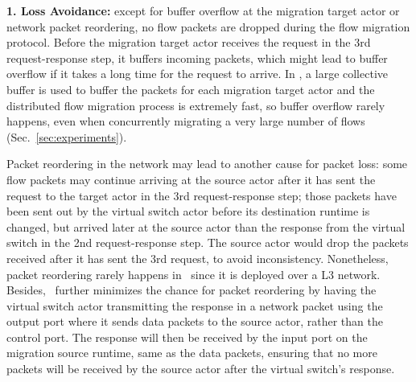\textbf{1. Loss Avoidance:} except for buffer overflow at the migration target actor or network packet reordering, no flow packets are dropped during the flow migration protocol. Before the migration target actor receives the request in the 3rd request-response step, it buffers incoming packets, which might lead to buffer overflow if it takes a long time for the request to arrive. %
 In \nfactor, a large collective buffer is used to buffer the packets for each migration target actor and the distributed flow migration process is extremely fast, so buffer overflow rarely happens, even when concurrently migrating a very large number of flows (Sec.~\ref{sec:experiments}). 
 
 Packet reordering in the network may lead to another cause for packet loss: some flow packets may continue arriving at the source actor after it has sent the request to the target actor in the 3rd request-response step; those packets have been sent out by the virtual switch actor before its destination runtime is changed, but arrived later at the source actor than the response from the virtual switch in the 2nd request-response step. %
 The source actor would drop the packets received after it has sent the 3rd request, to avoid inconsistency. Nonetheless, packet reordering rarely happens in \nfactor~since it is deployed over a L3 network. Besides, \nfactor~further minimizes the chance for packet reordering by having the virtual switch actor transmitting the response in a network packet using the output port where it sends data packets to the source actor, rather than the control port. The response will then be received by the input port on the migration source runtime, same as the data packets, ensuring that no more packets will be received by the source actor after the virtual switch's response.


